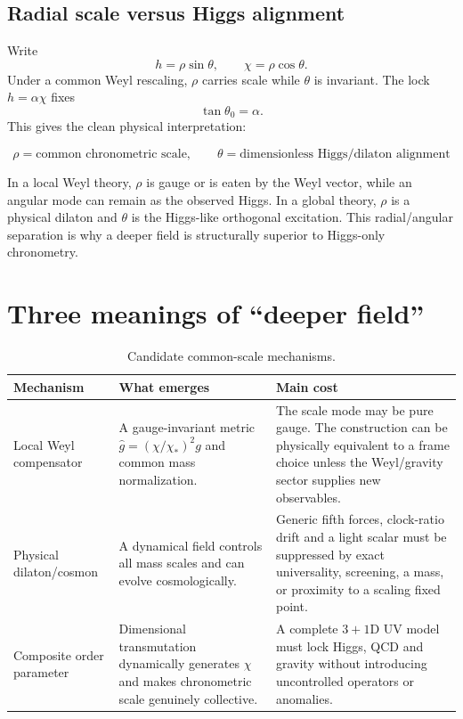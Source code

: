 \documentclass[11pt,a4paper]{article}
\begin{document}
\subsection{Radial scale versus Higgs alignment}

Write
\[
 h=\rho\sin\theta,
 \qquad
 \chi=\rho\cos\theta.
\]
Under a common Weyl rescaling, $\rho$ carries scale while $\theta$ is invariant. The lock $h=\alpha\chi$ fixes
\[
 \tan\theta_0=\alpha.
\]
This gives the clean physical interpretation:

\[
\boxed{
\rho=\text{common chronometric scale},
\qquad
\theta=\text{dimensionless Higgs/dilaton alignment}
}
\]

In a local Weyl theory, $\rho$ is gauge or is eaten by the Weyl vector, while an angular mode can remain as the observed Higgs. In a global theory, $\rho$ is a physical dilaton and $\theta$ is the Higgs-like orthogonal excitation. This radial/angular separation is why a deeper field is structurally superior to Higgs-only chronometry.

\section{Three meanings of ``deeper field''}

\begin{table}[H]
\centering
\caption{Candidate common-scale mechanisms.}
\begin{tabularx}{\textwidth}{@{}p{}p{}X@{}}
\toprule
Mechanism & What emerges & Main cost \\
\midrule
Local Weyl compensator & A gauge-invariant metric $\widehat g=(\chi/\chi_*)^2g$ and common mass normalization. & The scale mode may be pure gauge. The construction can be physically equivalent to a frame choice unless the Weyl/gravity sector supplies new observables. \\
Physical dilaton/cosmon & A dynamical field controls all mass scales and can evolve cosmologically. & Generic fifth forces, clock-ratio drift and a light scalar must be suppressed by exact universality, screening, a mass, or proximity to a scaling fixed point. \\
Composite order parameter & Dimensional transmutation dynamically generates $\chi$ and makes chronometric scale genuinely collective. & A complete $3+1$D UV model must lock Higgs, QCD and gravity without introducing uncontrolled operators or anomalies. \\
\bottomrule
\end{tabularx}
\end{table}
\end{document}
